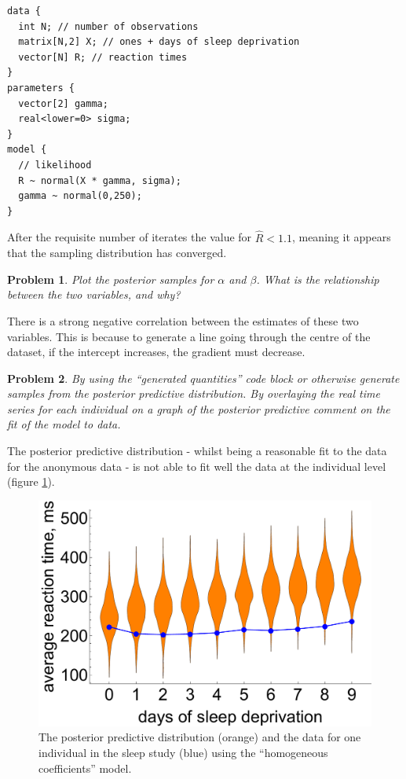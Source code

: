 \documentclass{article}
\newtheorem{problem}{Problem}[section]
\begin{document}
\begin{verbatim}
data {
  int N; // number of observations
  matrix[N,2] X; // ones + days of sleep deprivation
  vector[N] R; // reaction times
} 
parameters {
  vector[2] gamma;
  real<lower=0> sigma;
} 
model {
  // likelihood
  R ~ normal(X * gamma, sigma);
  gamma ~ normal(0,250);
}
\end{verbatim}

After the requisite number of iterates the value for $\hat{R}< 1.1$, meaning it appears that the sampling distribution has converged.

\begin{problem}
	Plot the posterior samples for $\alpha$ and $\beta$. What is the relationship between the two variables, and why?
\end{problem}

There is a strong negative correlation between the estimates of these two variables. This is because to generate a line going through the centre of the dataset, if the intercept increases, the gradient must decrease.

\begin{problem}
	By using the ``generated quantities'' code block or otherwise generate samples from the posterior predictive distribution. By overlaying the real time series for each individual on a graph of the posterior predictive comment on the fit of the model to data.
\end{problem}

The posterior predictive distribution - whilst being a reasonable fit to the data for the anonymous data - is not able to fit well the data at the individual level (figure \ref{fig:lec6_sleepPPC2}). 

\begin{figure}[ht]
	\centerline{\includegraphics[width=1.25\textwidth]{figures/lec6_sleepPPC2.pdf}}
	\caption{The posterior predictive distribution (orange) and the data for one individual in the sleep study (blue) using the ``homogeneous coefficients'' model.}\label{fig:lec6_sleepPPC2}
\end{figure}
\end{document}
